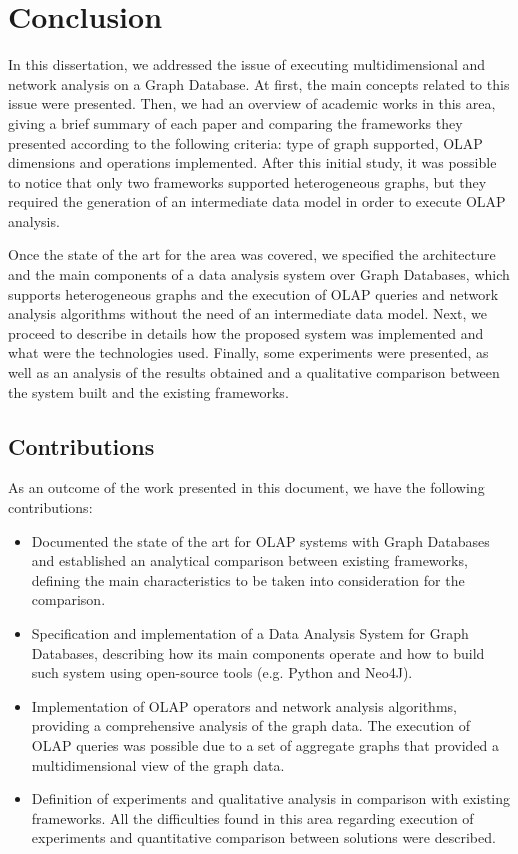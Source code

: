 \chapter{Conclusion}

In this dissertation, we addressed the issue of executing multidimensional and network analysis on a Graph Database. At first, the main concepts related to this issue were presented. Then, we had an overview of academic works in this area, giving a brief summary of each paper and comparing the frameworks they presented according to the following criteria: type of graph supported, OLAP dimensions and operations implemented. After this initial study, it was possible to notice that only two frameworks supported heterogeneous graphs, but they required the generation of an intermediate data model in order to execute OLAP analysis.

Once the state of the art for the area was covered, we specified the architecture and the main components of a data analysis system over Graph Databases, which supports heterogeneous graphs and the execution of OLAP queries and network analysis algorithms without the need of an intermediate data model. Next, we proceed to describe in details how the proposed system was implemented and what were the technologies used. Finally, some experiments were presented, as well as an analysis of the results obtained and a qualitative comparison between the system built and the existing frameworks. 

\section{Contributions}
As an outcome of the work presented in this document, we have the following contributions:
\begin{itemize}
\item Documented the state of the art for OLAP systems with Graph Databases and established an analytical comparison between existing frameworks, defining the main characteristics to be taken into consideration for the comparison.
\item Specification and implementation of a Data Analysis System for Graph Databases, describing how its main components operate and how to build such system using open-source tools (e.g. Python and Neo4J).
\item Implementation of OLAP operators and network analysis algorithms, providing a comprehensive analysis of the graph data. The execution of OLAP queries was possible due to a set of aggregate graphs that provided a multidimensional view of the graph data.
\item Definition of experiments and qualitative analysis in comparison with existing frameworks. All the difficulties found in this area regarding execution of experiments and quantitative comparison between solutions were described.
\end{itemize}

